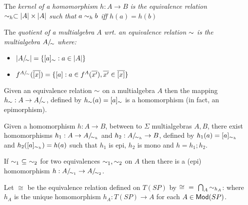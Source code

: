 \documentclass[10pt]{article}
\begin{document}
\begin{definition} \cite{catrel}
The \em{kernel} of a homomorphism $h:A \to B$ is the equivalence relation $\sim_{h}\subset |A| \times |A|$ such that $a \sim_{h} b$ iff $h(a) = h(b)$
\end{definition}

\begin{definition} \cite{catrel}
The \em{quotient} of a multialgebra $A$ wrt. an equivalence relation $\sim$ 
is the multialgebra $A/\!_{\sim}$ where:
	\begin{itemize}
	\item $|A/\!_{\sim}|= \{ [a]_{\sim}: a \in |A| \}$
	\item $f^{A/\!_{\sim}}(\overline{[x]}) = \{ [a]: a \in f^A(\overline{x'}), \overline{x'} \in \overline{[x]} \}$
	\end{itemize}
\end{definition}

\begin{fact}
\label{fa:epi}\cite{catrel}
Given an equivalence relation $\sim$ on a multialgebra $A$ then the mapping
$h_{\sim}:A \to A/\!_{\sim}$, defined by $h_{\sim}(a) = [a]_{\sim}$ is a
homomorphism (in fact, an epimorphism).
\end{fact}

\begin{fact}
\label{fa:factor}\cite{catrel}
Given a homomorphism $h:A \to B$, between to $\Sigma$ multialgebras $A,B$,
there exist homomorphisms $h_1: A \to A/\!_{\sim_{h}}$ and $h_2: A/\!_{\sim_{h}} \to B$, defined by $h_1(a) = [a]_{\sim_{h}}$ and
$h_2([a]_{\sim_{h}}) = h(a)$ such that $h_1$ is epi, $h_2$ is mono and $h=h_1;h_2$.
\end{fact}

\begin{fact}\cite{catrel}
\label{fa:subequi}
If $\sim_1\ \subseteq\ \sim_2$ for two equivalences $\sim_1 , \sim_2$ on
$A$ then there is a (epi) homomorphism $h: A/\!_{\sim_1} \to A/\!_{\sim_2}$.
\end{fact}

\begin{definition}\label{de:cong}
Let $\cong$ be the equivalence relation defined on $T(SP)$ by ${\cong}\ =\ 
{\bigcap_A{ \kernel{h_A}}}$: where $h_A$ is the unique homomorphism
$h_A:T(SP) \to A$ for each $A \in {\sf {Mod}}(SP)$.
\end{definition}
\end{document}
